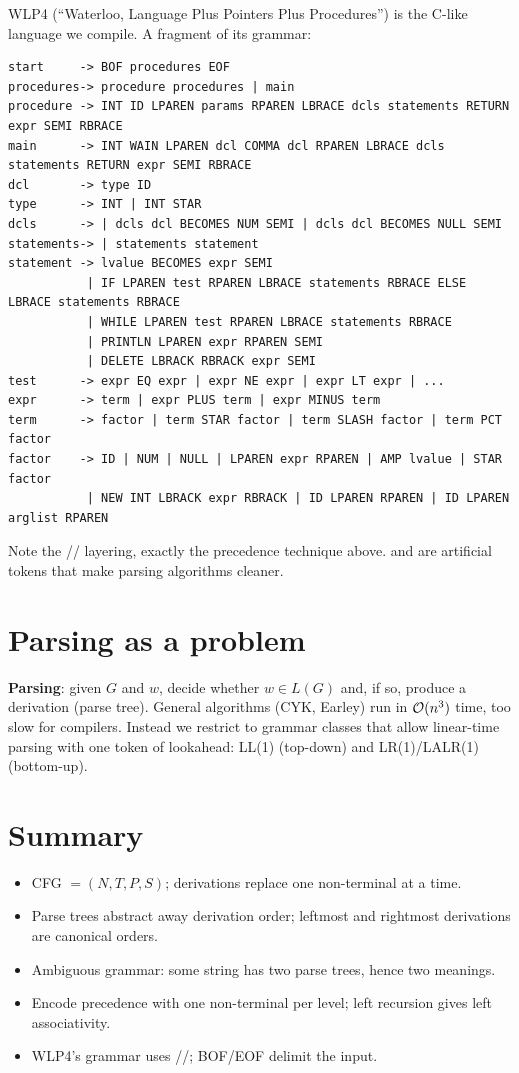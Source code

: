 WLP4 (``Waterloo, Language Plus Pointers Plus Procedures'') is the C-like language we compile.
A fragment of its grammar:
\begin{lstlisting}
start     -> BOF procedures EOF
procedures-> procedure procedures | main
procedure -> INT ID LPAREN params RPAREN LBRACE dcls statements RETURN expr SEMI RBRACE
main      -> INT WAIN LPAREN dcl COMMA dcl RPAREN LBRACE dcls statements RETURN expr SEMI RBRACE
dcl       -> type ID
type      -> INT | INT STAR
dcls      -> | dcls dcl BECOMES NUM SEMI | dcls dcl BECOMES NULL SEMI
statements-> | statements statement
statement -> lvalue BECOMES expr SEMI
           | IF LPAREN test RPAREN LBRACE statements RBRACE ELSE LBRACE statements RBRACE
           | WHILE LPAREN test RPAREN LBRACE statements RBRACE
           | PRINTLN LPAREN expr RPAREN SEMI
           | DELETE LBRACK RBRACK expr SEMI
test      -> expr EQ expr | expr NE expr | expr LT expr | ...
expr      -> term | expr PLUS term | expr MINUS term
term      -> factor | term STAR factor | term SLASH factor | term PCT factor
factor    -> ID | NUM | NULL | LPAREN expr RPAREN | AMP lvalue | STAR factor
           | NEW INT LBRACK expr RBRACK | ID LPAREN RPAREN | ID LPAREN arglist RPAREN
\end{lstlisting}
Note the // layering, exactly the precedence technique above.
 and  are artificial tokens that make parsing algorithms cleaner.

\section{Parsing as a problem}

\textbf{Parsing}: given $G$ and $w$, decide whether $w\in L(G)$ and, if so, produce a
derivation (parse tree). General algorithms (CYK, Earley) run in $\mathcal{O}(n^3)$ time, too
slow for compilers. Instead we restrict to grammar classes that allow linear-time parsing
with one token of lookahead: LL(1) (top-down) and LR(1)/LALR(1) (bottom-up).

\section{Summary}
\begin{itemize}
  \item CFG $=(N,T,P,S)$; derivations replace one non-terminal at a time.
  \item Parse trees abstract away derivation order; leftmost and rightmost derivations are
        canonical orders.
  \item Ambiguous grammar: some string has two parse trees, hence two meanings.
  \item Encode precedence with one non-terminal per level; left recursion gives left associativity.
  \item WLP4's grammar uses //; BOF/EOF delimit the input.
\end{itemize}
